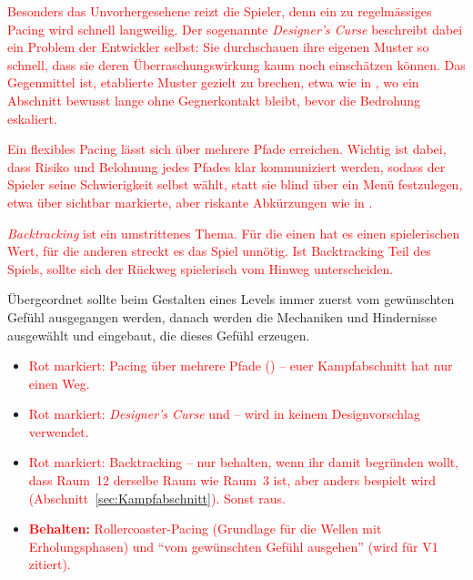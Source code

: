 \documentclass[../Main.tex]{subfiles}
\begin{document}
\textcolor{red}{Besonders das Unvorhergesehene reizt die Spieler, denn ein zu regelmässiges Pacing wird schnell langweilig. Der sogenannte \textit{Designer's Curse} beschreibt dabei ein Problem der Entwickler selbst: Sie durchschauen ihre eigenen Muster so schnell, dass sie deren Überraschungswirkung kaum noch einschätzen können. Das Gegenmittel ist, etablierte Muster gezielt zu brechen, etwa wie in ,\autocite{visceral_deadspace2_2011} wo ein Abschnitt bewusst lange ohne Gegnerkontakt bleibt, bevor die Bedrohung eskaliert.\autocite{gdc_tenprinciples2010}}

\textcolor{red}{Ein flexibles Pacing lässt sich über mehrere Pfade erreichen. Wichtig ist dabei, dass Risiko und Belohnung jedes Pfades klar kommuniziert werden, sodass der Spieler seine Schwierigkeit selbst wählt, statt sie blind über ein Menü festzulegen, etwa über sichtbar markierte, aber riskante Abkürzungen wie in .\autocite{criterion_burnout_2001,gdc_tenprinciples2010}}

\textcolor{red}{\textit{Backtracking} ist ein umstrittenes Thema. Für die einen hat es einen spielerischen Wert, für die anderen streckt es das Spiel unnötig. Ist Backtracking Teil des Spiels, sollte sich der Rückweg spielerisch vom Hinweg unterscheiden.\autocite{gdc_tenprinciples2010}}

Übergeordnet sollte beim Gestalten eines Levels immer zuerst vom gewünschten Gefühl ausgegangen werden, danach werden die Mechaniken und Hindernisse ausgewählt und eingebaut, die dieses Gefühl erzeugen.\autocite{gdc_tenprinciples2010}

\begin{itemize}[leftmargin=1.5cm]
    \item \textcolor{red}{Rot markiert: Pacing über mehrere Pfade () -- euer Kampfabschnitt hat nur einen Weg.}
    \item \textcolor{red}{Rot markiert: \textit{Designer's Curse} und  -- wird in keinem Designvorschlag verwendet.}
    \item \textcolor{red}{Rot markiert: Backtracking -- nur behalten, wenn ihr damit begründen wollt, dass Raum~12 derselbe Raum wie Raum~3 ist, aber anders bespielt wird (Abschnitt~\ref{sec:Kampfabschnitt}). Sonst raus.}
    \item \textcolor{red}{\textbf{Behalten:} Rollercoaster-Pacing (Grundlage für die Wellen mit Erholungsphasen) und \enquote{vom gewünschten Gefühl ausgehen} (wird für V1 zitiert).}
\end{itemize}
\end{document}
